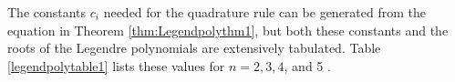 \documentclass[12pt,a4paper]{article}
\begin{document}
%
%
%
%
%
%
%
%
%
%
%
%
%
%
%
The constants $c_{i}$ needed for the quadrature rule can be generated from the equation in Theorem \ref{thm:Legendpolythm1}, but both these constants and the roots of the Legendre polynomials are extensively tabulated. Table \ref{legendpolytable1} lists these values for $n=2,3,4$, and 5 .
\end{document}
